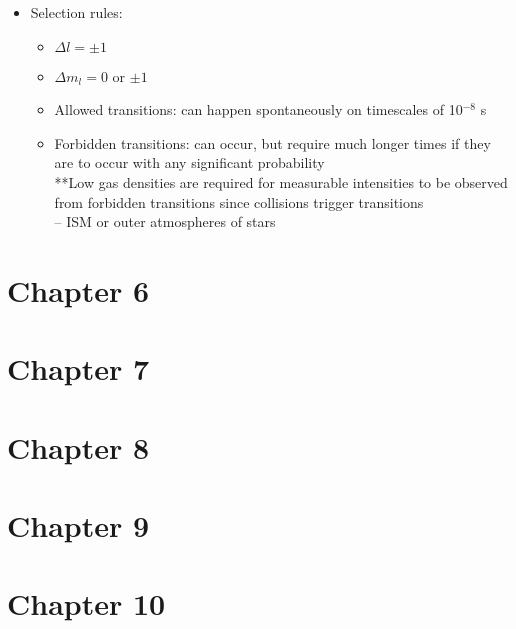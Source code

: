\documentclass[12pt]{article}
\begin{document}
\begin{itemize}
\item Selection rules:
\begin{itemize}
\item $\Delta l = \pm 1$
\item $\Delta m_l = 0$ or $\pm 1$
\end{itemize}
\begin{itemize}
\item Allowed transitions: can happen spontaneously on timescales of 10$^{-8}$ s
\item Forbidden transitions: can occur, but require much longer times if they are to occur with any significant probability
\\**Low gas densities are required for measurable intensities to be observed from forbidden transitions since collisions trigger transitions
\\ -- ISM or outer atmospheres of stars
\end{itemize}
\end{itemize}

\section*{Chapter 6}

\section*{Chapter 7}

\section*{Chapter 8}

\section*{Chapter 9}

\section*{Chapter 10}
\end{document}
